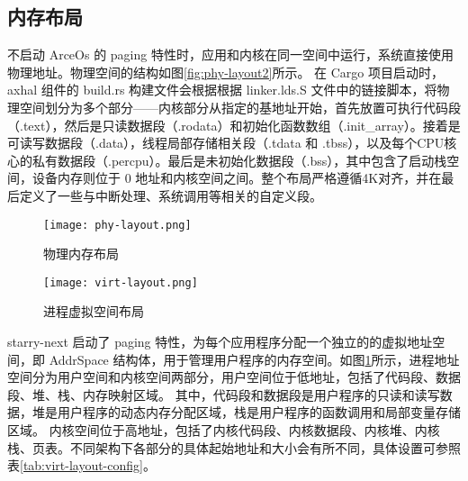 \subsection{内存布局}

不启动 ArceOs 的 paging 特性时，应用和内核在同一空间中运行，系统直接使用物理地址。物理空间的结构如图\ref{fig:phy-layout2}所示。
在 Cargo 项目启动时，axhal 组件的 build.rs 构建文件会根据根据 linker.lds.S 文件中的链接脚本，将物理空间划分为多个部分——内核部分从指定的基地址开始，首先放置可执行代码段（.text），然后是只读数据段（.rodata）和初始化函数数组（.init\_array）。接着是可读写数据段（.data），线程局部存储相关段（.tdata 和 .tbss），以及每个CPU核心的私有数据段（.percpu）。最后是未初始化数据段（.bss），其中包含了启动栈空间，设备内存则位于 0 地址和内核空间之间。整个布局严格遵循4K对齐，并在最后定义了一些与中断处理、系统调用等相关的自定义段。

\begin{figure}[H]
\centering %
\begin{minipage}[b]{0.45\textwidth} %
\centering %
\texttt{[image: phy-layout.png]} %
\caption{物理内存布局}
\label{fig:phy-layout2}
\end{minipage}
\begin{minipage}[b]{0.45\textwidth} %
\centering %
\texttt{[image: virt-layout.png]}%
\caption{进程虚拟空间布局}
\label{fig:virt-layout2}
\end{minipage}
\end{figure}



starry-next 启动了 paging 特性，为每个应用程序分配一个独立的的虚拟地址空间，即 AddrSpace 结构体，用于管理用户程序的内存空间。如图\ref{fig:virt-layout2}所示，进程地址空间分为用户空间和内核空间两部分，用户空间位于低地址，包括了代码段、数据段、堆、栈、内存映射区域。
其中，代码段和数据段是用户程序的只读和读写数据，堆是用户程序的动态内存分配区域，栈是用户程序的函数调用和局部变量存储区域。
内核空间位于高地址，包括了内核代码段、内核数据段、内核堆、内核栈、页表。不同架构下各部分的具体起始地址和大小会有所不同，具体设置可参照表\ref{tab:virt-layout-config}。

